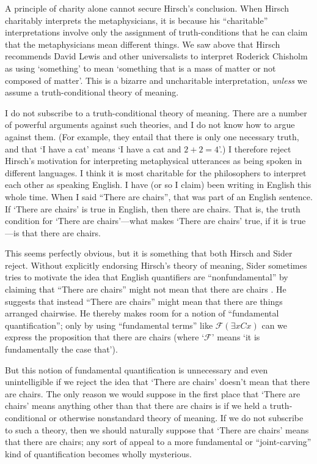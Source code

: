 \documentclass[12pt,twoside]{reedfancy}
\begin{document}
\begin{spacing}{1.25}
A principle of charity alone cannot secure Hirsch's conclusion.  When
Hirsch charitably interprets the metaphysicians, it is because his
``charitable'' interpretations involve only the assignment of
truth-conditions that he can claim that the metaphysicians mean
different things.  We saw above that Hirsch recommends David Lewis and
other universalists to interpret Roderick Chisholm as using
`something' to mean `something that is a mass of matter or not
composed of matter'.  This is a bizarre and uncharitable
interpretation, {\em unless} we assume a truth-conditional theory of
meaning.

I do not subscribe to a truth-conditional theory of meaning.  There
are a number of powerful arguments against such theories, and I do not
know how to argue against them.  (For example, they entail that there
is only one necessary truth, and that `I have a cat' means `I have a
cat and $2 + 2 = 4$'.)  I therefore reject Hirsch's motivation for
interpreting metaphysical utterances as being spoken in different
languages.  I think it is most charitable for the philosophers to
interpret each other as speaking English.  I have (or so I claim) been
writing in English this whole time.  When I said ``There are chairs'',
that was part of an English sentence.  If `There are chairs' is true
in English, then there are chairs.  That is, the truth condition for
`There are chairs'---what makes `There are chairs' true, if it is
true---is that there are chairs.

This seems perfectly obvious, but it is something that both Hirsch and
Sider reject.  Without explicitly endorsing Hirsch's theory of
meaning, Sider sometimes tries to motivate the idea that English
quantifiers are ``nonfundamental'' by claiming that ``There are
chairs'' might not mean that there are chairs
\citeyearpar[171]{sider2011d}.  He suggests that instead ``There are
chairs'' might mean that there are things arranged chairwise.  He
thereby makes room for a notion of ``fundamental quantification'';
only by using ``fundamental terms'' like $\mathcal{F} ( \exists x Cx
)$ can we express the proposition that there are chairs (where
`$\mathcal{F}$' means `it is fundamentally the case that').

But this notion of fundamental quantification is unnecessary and even
unintelligible if we reject the idea that `There are chairs' doesn't
mean that there are chairs.  The only reason we would suppose in the
first place that `There are chairs' means anything other than that
there are chairs is if we held a truth-conditional or otherwise
nonstandard theory of meaning.  If we do not subscribe to such a
theory, then we should naturally suppose that `There are chairs' means
that there are chairs; any sort of appeal to a more fundamental or
``joint-carving'' kind of quantification becomes wholly mysterious.


\end{spacing}
\end{document}
